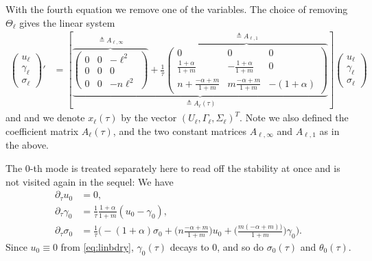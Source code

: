 \documentclass[a4paper,11pt]{article}
\def\l{{\ell}}
\theoremstyle{remark}
\begin{document}
With the fourth equation we remove one of the variables. The choice of removing $\Theta_\ell$ gives the linear system
\begin{equation} \label{eq:l-system2}
\begin{aligned}
 \begin{pmatrix} u_\ell\\ \gamma_\ell \\ \sigma_\ell \end{pmatrix}'
 &= \left[\underbrace{\overbrace{\begin{pmatrix}
   0 & 0 & -\l^2\\
   0 & 0 & 0\\
   0 & 0 & -n\l^2
  \end{pmatrix} }^{\triangleq A_{\ell,\infty}}
  + \frac{1}{\tau}
  \overbrace{\begin{pmatrix}
   0 & 0 & 0\\
   \frac{1+\alpha}{1+m} & -\frac{1+\alpha}{1+m} & 0\\
   n+ \frac{-\alpha+m}{1+m} & m\frac{-\alpha+m}{1+m}& -(1+\alpha)
  \end{pmatrix} }^{\triangleq A_{\ell,1}}}_{\triangleq A_\ell(\tau)} \right] \begin{pmatrix} u_\ell\\ \gamma_\ell \\ \sigma_\ell \end{pmatrix}
\end{aligned}
\end{equation}
and and we denote $x_\ell(\tau)$ by the vector $(U_\ell,\Gamma_\ell, \Sigma_\ell)^T$. Note we also defined the coefficient matrix $A_\ell(\tau)$, and the two constant matrices $A_{\ell,\infty}$ and $A_{\ell,1}$ as in the above.

The $0$-th mode is treated separately here to read off the stability at once and is not visited again in the sequel: We have
\begin{align*}
   \partial_\tau u_0 &= 0,\\
  \partial_\tau\gamma_0 &= \frac{1}{\tau}\frac{1+\alpha}{1+m}(u_0-\gamma_0),\\
  \partial_\tau\sigma_0 &= \frac{1}{\tau}\Big( -(1+\alpha)\sigma_0 + \big(n\frac{-\alpha+m}{1+m}\big)u_0 + \big(\frac{m(-\alpha+m))}{1+m}\big)\gamma_0\Big).
\end{align*}
Since $u_0\equiv0$ from \eqref{eq:linbdry}, $\gamma_0(\tau)$ decays to $0$, and so do $\sigma_0(\tau)$ and $\theta_0(\tau)$.
\end{document}
